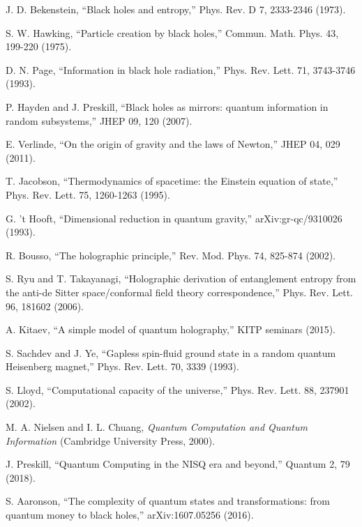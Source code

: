 \documentclass[12pt,a4paper]{article}
\begin{document}
\begin{thebibliography}{99}
J. D. Bekenstein, ``Black holes and entropy,'' Phys. Rev. D 7, 2333-2346 (1973).

S. W. Hawking, ``Particle creation by black holes,'' Commun. Math. Phys. 43, 199-220 (1975).

D. N. Page, ``Information in black hole radiation,'' Phys. Rev. Lett. 71, 3743-3746 (1993).

P. Hayden and J. Preskill, ``Black holes as mirrors: quantum information in random subsystems,'' JHEP 09, 120 (2007).

E. Verlinde, ``On the origin of gravity and the laws of Newton,'' JHEP 04, 029 (2011).

T. Jacobson, ``Thermodynamics of spacetime: the Einstein equation of state,'' Phys. Rev. Lett. 75, 1260-1263 (1995).

G. 't Hooft, ``Dimensional reduction in quantum gravity,'' arXiv:gr-qc/9310026 (1993).

R. Bousso, ``The holographic principle,'' Rev. Mod. Phys. 74, 825-874 (2002).

S. Ryu and T. Takayanagi, ``Holographic derivation of entanglement entropy from the anti-de Sitter space/conformal field theory correspondence,'' Phys. Rev. Lett. 96, 181602 (2006).

A. Kitaev, ``A simple model of quantum holography,'' KITP seminars (2015).

S. Sachdev and J. Ye, ``Gapless spin-fluid ground state in a random quantum Heisenberg magnet,'' Phys. Rev. Lett. 70, 3339 (1993).

S. Lloyd, ``Computational capacity of the universe,'' Phys. Rev. Lett. 88, 237901 (2002).

M. A. Nielsen and I. L. Chuang, \textit{Quantum Computation and Quantum Information} (Cambridge University Press, 2000).

J. Preskill, ``Quantum Computing in the NISQ era and beyond,'' Quantum 2, 79 (2018).

S. Aaronson, ``The complexity of quantum states and transformations: from quantum money to black holes,'' arXiv:1607.05256 (2016).

\end{thebibliography}
\end{document}

